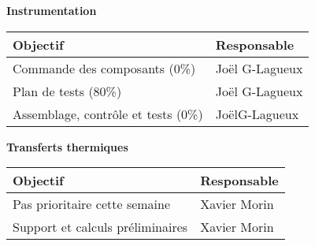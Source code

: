 \textbf{\large Instrumentation}\\
\begin{tabularx}{\linewidth}{
    |>{\hsize=1.75\hsize}X|%
    >{\hsize=0.25\hsize}X|%
  }
    \hline
    \textbf{Objectif} & \textbf{Responsable} \\\hline
    Commande des composants (0\%)  & Joël G-Lagueux \\\hline 
    Plan de tests (80\%)  & Joël G-Lagueux \\\hline
    Assemblage, contrôle et tests (0\%) & JoëlG-Lagueux\\\hline
\end{tabularx}
\medskip

\textbf{\large Transferts thermiques}\\
\begin{tabularx}{\linewidth}{
    |>{\hsize=1.75\hsize}X|%
    >{\hsize=0.25\hsize}X|%
  }
    \hline
    \textbf{Objectif} & \textbf{Responsable} \\\hline
    Pas prioritaire cette semaine & Xavier Morin \\\hline
    Support et calculs préliminaires & Xavier Morin \\\hline
\end{tabularx}



%
%
%  